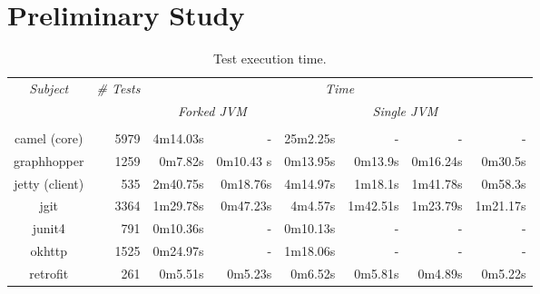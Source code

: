 \section{Preliminary Study}

\begin{table*}[t]
  \centering
  \begin{tabular}{|c|r|r|r|r|r|r|r|}
    \hline
    \multirow{2}{*}{\emph{Subject}} & \multirow{2}{*}{\emph{\# Tests}} &  \multicolumn{6}{c|}{\emph{Time}}\\
    \cline{3-8}
    & & \multicolumn{2}{c|}{\emph{Forked JVM}} & \multicolumn{4}{c|}{\emph{Single JVM}}   \\
    \cline{3-8}
    & & \multicolumn{1}{c|}{\Seq{}} & \multicolumn{1}{c|}{\ParClassSeqMeth{}} & \multicolumn{1}{c|}{\Seq{}} & \multicolumn{1}{c|}{\ParClassSeqMeth{}} & \multicolumn{1}{c|}{\SeqClassParMeth{}} & \multicolumn{1}{c|}{\ParClassParMeth{}}\\     \hline
    camel (core) & 5979 & 4m14.03s & - & 25m2.25s & - & - & - \\
    \hline
    graphhopper & 1259 & 0m7.82s & 0m10.43 s & 0m13.95s & 0m13.9s & 0m16.24s & 0m30.5s \\
    \hline
    jetty (client) & 535 & 2m40.75s & 0m18.76s & 4m14.97s & 1m18.1s & 1m41.78s & 0m58.3s \\
    \hline
    jgit & 3364 & 1m29.78s & 0m47.23s & 4m4.57s & 1m42.51s & 1m23.79s & 1m21.17s \\
    \hline
    junit4 & 791 & 0m10.36s & - & 0m10.13s & - & - & - \\
    \hline
    okhttp & 1525 & 0m24.97s & - & 1m18.06s & - & - & - \\
    \hline
    retrofit & 261 & 0m5.51s & 0m5.23s & 0m6.52s & 0m5.81s & 0m4.89s & 0m5.22s \\
    \hline
  \end{tabular}
  \caption{\label{table:cost}Test execution time.}
\end{table*}


